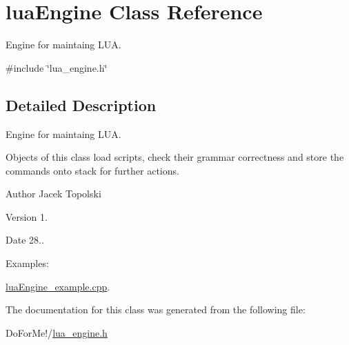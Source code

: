 \hypertarget{classlua_engine}{\section{lua\-Engine Class Reference}
\label{classlua_engine}
}


Engine for maintaing L\-U\-A.  




{\ttfamily \#include \char`\"{}lua\-\_\-engine.\-h\char`\"{}}



\subsection{Detailed Description}
Engine for maintaing L\-U\-A. 

Objects of this class load scripts, check their grammar correctness and store the commands onto stack for further actions. \begin{DoxyAuthor}{Author}
Jacek Topolski 
\end{DoxyAuthor}
\begin{DoxyVersion}{Version}
1. 
\end{DoxyVersion}
\begin{DoxyDate}{Date}
28.. 
\end{DoxyDate}
\begin{Desc}
\item[Examples\-: ]\par
\hyperlink{lua_engine_example_8cpp-example}{lua\-Engine\-\_\-example.\-cpp}.\end{Desc}


The documentation for this class was generated from the following file\-:\begin{DoxyCompactItemize}
\item 
Do\-For\-Me!/\hyperlink{lua__engine_8h}{lua\-\_\-engine.\-h}\end{DoxyCompactItemize}
